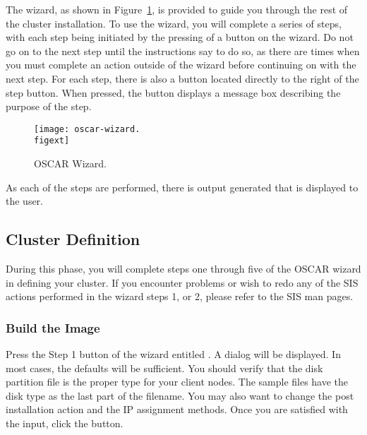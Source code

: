 The wizard, as shown in
Figure~\ref{fig:detailed-oscar-wizard}, is provided to guide you
through the rest of the cluster installation.  To use the wizard, you
will complete a series of steps, with each step being initiated by the
pressing of a button on the wizard. Do not go on to the next step
until the instructions say to do so, as there are times when you must
complete an action outside of the wizard before continuing on with the
next step. For each step, there is also a  button located
directly to the right of the step button. When pressed, the
 button displays a message box describing the purpose of
the step.

\begin{figure}[htbp]
  \begin{center}
    \texttt{[image: oscar-wizard.\\figext]}
    \caption{OSCAR Wizard.}
    \label{fig:detailed-oscar-wizard}
  \end{center}
\end{figure}
  
As each of the steps are performed, there is output generated that is
displayed to the user. 


\subsection{Cluster Definition}
\label{sec:detailed-cluster-def}

During this phase, you will complete steps one through five of the
OSCAR wizard in defining your cluster. If you encounter problems or
wish to redo any of the SIS actions performed in the wizard steps 1,
or 2, please refer to the SIS man pages.

\subsubsection{Build the Image} 
\label{det:buildimage}

Press the Step 1 button of the wizard entitled . A dialog will be displayed. In most cases, the defaults 
will be sufficient. You should verify that the disk partition file is
the proper type for your client nodes. The sample files have the
disk type as the last part of the filename. You may also want to change
the post installation action and the IP assignment methods.
Once you are satisfied with the input, click the  button.

